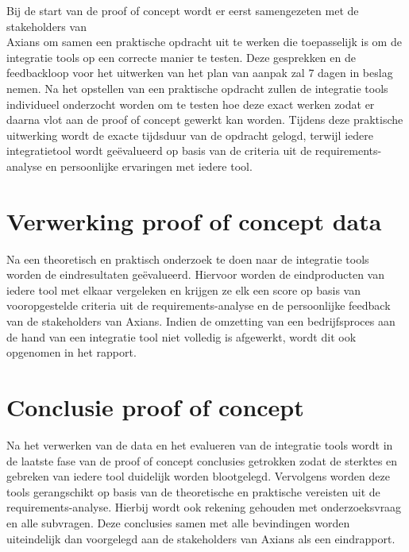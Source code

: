 Bij de start van de proof of concept wordt er eerst samengezeten met de stakeholders van \\Axians om samen een praktische opdracht uit te werken die toepasselijk is om de integratie tools op een correcte manier te testen. Deze gesprekken en de feedbackloop voor het uitwerken van het plan van aanpak zal 7 dagen in beslag nemen. Na het opstellen van een praktische opdracht zullen de integratie tools individueel onderzocht worden om te testen hoe deze exact werken zodat er daarna vlot aan de proof of concept gewerkt kan worden. Tijdens deze praktische uitwerking wordt de exacte tijdsduur van de opdracht gelogd, terwijl iedere integratietool wordt geëvalueerd op basis van de criteria uit de requirements-analyse en persoonlijke ervaringen met iedere tool.

\section{Verwerking proof of concept data}
\label{sec:Verwerking proof of concept dataBP}

Na een theoretisch en praktisch onderzoek te doen naar de integratie tools worden de eindresultaten geëvalueerd. Hiervoor worden de eindproducten van iedere tool met elkaar vergeleken en krijgen ze elk een score op basis van vooropgestelde criteria uit de requirements-analyse en de persoonlijke feedback van de stakeholders van Axians. Indien de omzetting van een bedrijfsproces aan de hand van een integratie tool niet volledig is afgewerkt, wordt dit ook opgenomen in het rapport.

\section{Conclusie proof of concept}
\label{sec:Conclusie proof of conceptBP}

Na het verwerken van de data en het evalueren van de integratie tools wordt in de laatste fase van de proof of concept conclusies getrokken zodat de sterktes en gebreken van iedere tool duidelijk worden blootgelegd. Vervolgens worden deze tools gerangschikt op basis van de theoretische en praktische vereisten uit de requirements-analyse. Hierbij wordt ook rekening gehouden met onderzoeksvraag en alle subvragen. Deze conclusies samen met alle bevindingen worden uiteindelijk dan voorgelegd aan de stakeholders van Axians als een eindrapport.

